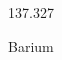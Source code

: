\documentclass[12pt]{article}
\begin{document}
\hfill{}
\vfill
\begin{center}
  {\fontsize{50}{60}
  }

  137.327

Barium
\end{center}
\vfill
\end{document}
